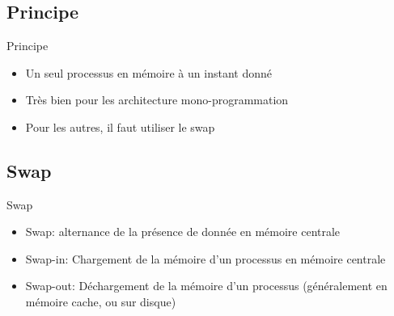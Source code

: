 \section{\sectitle}
\begin{frame}{\sectitle}
\def\subsectitle{Principe}
\subsection{\subsectitle}
\begin{block}{\subsectitle}
\begin{itemize}
    \item Un seul processus en mémoire à un instant donné
    \item Très bien pour les architecture mono-programmation
    \item Pour les autres, il faut utiliser le swap
\end{itemize}
\end{block}
\def\subsectitle{Swap}
\subsection{\subsectitle}
\begin{block}{\subsectitle}
\begin{itemize}
    \item Swap: alternance de la présence de donnée en mémoire centrale
    \item Swap-in: Chargement de la mémoire d'un processus en mémoire centrale
    \item Swap-out: Déchargement de la mémoire d'un processus (généralement en
    mémoire cache, ou sur disque)
\end{itemize}
\end{block}
\end{frame}

\def\sectitle{Partage mémoire}
